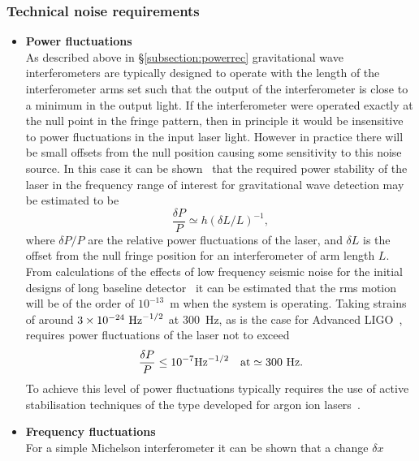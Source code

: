 \documentclass{article}
\begin{document}

\subsubsection{Technical noise requirements}
\label{subsubsection:lasernoise}

\begin{itemize}
\item {\bf Power fluctuations} \\
As described above in \S\ref{subsection:powerrec} gravitational wave
interferometers are typically designed to operate with the length of the
interferometer arms set such that the output of the interferometer is close to a
minimum in the output light. If the interferometer were operated exactly at the
null point in the fringe pattern, then in principle it would be insensitive to
power fluctuations in the input laser light. However in practice there will be
small offsets from the null position causing some sensitivity to this noise
source.  In this case it can be shown~\cite{Hough} that the required power
stability of the laser in the frequency range of interest for gravitational wave
detection may be estimated to be
%
\begin{equation}
  \frac{\delta P}{P} \simeq h (\delta L/L)^{-1},
  \label{equation:intnoise1}
\end{equation}
%
where $\delta P/P$ are the relative power fluctuations of the laser, and $\delta
L$ is the offset from the null fringe position for an interferometer of arm
length $L$.  From calculations of the effects of low frequency seismic noise for
the initial designs of long baseline detector~\cite{Hough} it can be estimated
that the rms motion will be of the order of $10^{-13}$~m when the system is
operating. Taking strains of around $3 \times 10^{-24}~{\rm Hz}^{-1/2}$ at
300~Hz, as is the case for Advanced LIGO~\cite{Harry:2010}, requires power
fluctuations of
the laser not to exceed
%
\begin{equation}
  \frac{\delta P}{P} \leq 10^{-7} {\rm Hz}^{-1/2} \quad {\rm at}
  \simeq 300 {\rm \ Hz}.
  \label{equation:intnoise2}
\end{equation}
%
To achieve this level of power fluctuations typically requires the use of active
stabilisation techniques of the type developed for argon ion
lasers~\cite{Mangan}.
%
\item {\bf Frequency fluctuations} \\
For a simple Michelson interferometer it can be shown that a change $\delta x$

\end{itemize}
\end{document}
